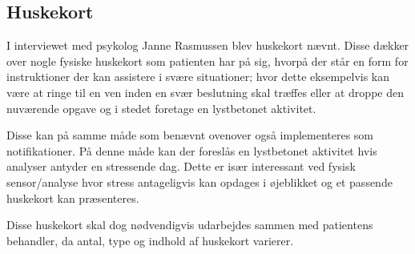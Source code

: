 \subsection{Huskekort}
I interviewet med psykolog Janne Rasmussen blev huskekort nævnt.
Disse dækker over nogle fysiske huskekort som patienten har på sig, hvorpå der står en form for instruktioner der kan assistere i svære situationer; hvor dette eksempelvis kan være at ringe til en ven inden en svær beslutning skal træffes eller at droppe den nuværende opgave og i stedet foretage en lystbetonet aktivitet.

Disse kan på samme måde som benævnt ovenover også implementeres som notifikationer.
På denne måde kan der foreslås en lystbetonet aktivitet hvis analyser antyder en stressende dag.
Dette er især interessant ved fysisk sensor/analyse hvor stress antageligvis kan opdages i øjeblikket og et passende huskekort kan præsenteres.

Disse huskekort skal dog nødvendigvis udarbejdes sammen med patientens behandler, da antal, type og indhold af huskekort varierer.
